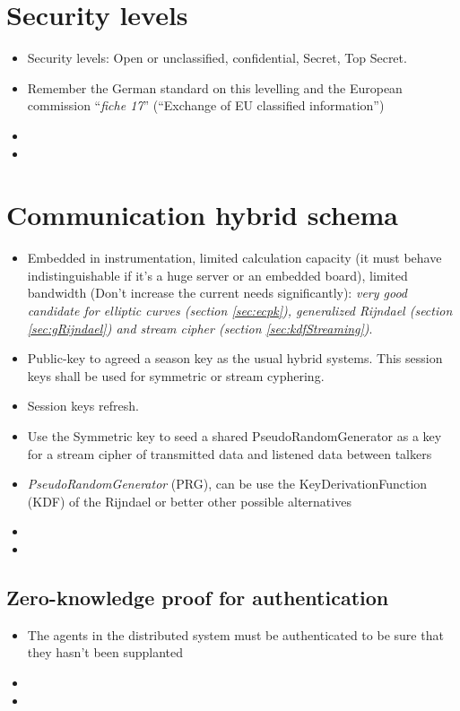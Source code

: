 \documentclass[10pt,a4paper,twoside]{llncs}
\begin{document}
%
\section{Security levels \label{sec:secLevel}}

\begin{itemize}
 \item Security levels: Open or unclassified, confidential, Secret, Top Secret.
 \item Remember the German standard on this levelling and the European commission ``\emph{fiche 17}'' (``Exchange of EU classified information'')
 \item
 \item
\end{itemize}

%
\section{Communication hybrid schema \label{sec:intercom}}

\begin{itemize}
 \item Embedded in instrumentation, limited calculation capacity (it must behave indistinguishable if it's a huge server or an embedded board), limited bandwidth (Don't increase the current needs significantly): \emph{very good candidate for elliptic curves (section \ref{sec:ecpk}), generalized Rijndael (section \ref{sec:gRijndael}) and stream cipher (section \ref{sec:kdfStreaming})}.
 \item Public-key to agreed a season key as the usual hybrid systems. This session keys shall be used for symmetric or stream cyphering.
 \item Session keys refresh.
 \item Use the Symmetric key to seed a shared PseudoRandomGenerator as a key for a stream cipher of transmitted data and listened data between talkers
 \item \emph{PseudoRandomGenerator} (PRG), can be use the KeyDerivationFunction (KDF) of the Rijndael or better other possible alternatives
 \item 
 \item 
\end{itemize}

%
\subsection{Zero-knowledge proof for authentication \label{sec:auth}}
\begin{itemize}
 \item The agents in the distributed system must be authenticated to be sure that they hasn't been supplanted
 \item 
 \item 
\end{itemize}
\end{document}
